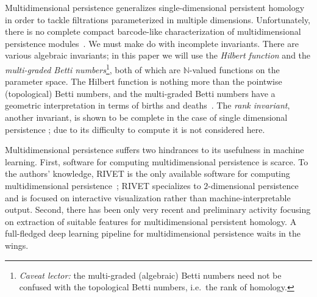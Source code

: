 \documentclass{article}
\begin{document}
Multidimensional persistence generalizes single-dimensional persistent homology
in order to tackle filtrations parameterized in multiple dimensions.
Unfortunately, there is no complete
compact barcode-like characterization of multidimensional persistence
modules~\cite{carlsson_theory_2009}. We must make do with incomplete invariants.
There are various algebraic invariants; in this paper we will use the
\textit{Hilbert function} and the \textit{multi-graded Betti numbers}\footnote{\textit{Caveat lector:} the multi-graded (algebraic) Betti numbers need not be confused with the topological Betti numbers, i.e.~the rank of homology.}, both of
which are $\mathbb{N}$-valued functions on the parameter space.
The Hilbert function is nothing more than the pointwise
(topological) Betti numbers, and the multi-graded Betti
numbers have a geometric interpretation in terms of births and deaths~\cite{knudson_refinement_2008}.
 The \textit{rank
 invariant}, another invariant, is shown to be complete in the case of single
 dimensional persistence \cite{carlsson_theory_2009}; due to its difficulty to
 compute it is not considered here.

Multidimensional persistence suffers two hindrances to its usefulness in
machine learning. First, software for computing multidimensional persistence is
scarce. To the authors' knowledge, RIVET is the only available software for
computing multidimensional persistence~\cite{lesnick_interactive_2015}; RIVET
specializes to $2$-dimensional persistence and is focused on interactive
visualization rather than machine-interpretable output.
Second, %
there has been only very recent and preliminary activity \cite{vipond2020multiparameter,carriere2020multiparameter} focusing on extraction
of suitable features for multidimensional persistent homology. A full-fledged deep learning pipeline
for multidimensional persistence waits in the wings.
\end{document}
